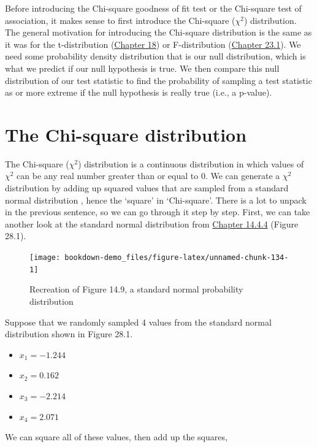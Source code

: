 \documentclass[
]{scrbook}
\providecommand{\tightlist}{%
  \setlength{\itemsep}{0pt}\setlength{\parskip}{0pt}}
\begin{document}
Before introducing the Chi-square goodness of fit test or the Chi-square test of association, it makes sense to first introduce the Chi-square (\(\chi^{2}\)) distribution.
The general motivation for introducing the Chi-square distribution is the same as it was for the t-distribution (\protect\hyperlink{Chapter_18}{Chapter 18}) or F-distribution (\protect\hyperlink{the-f-distribution}{Chapter 23.1}).
We need some probability density distribution that is our null distribution, which is what we predict if our null hypothesis is true.
We then compare this null distribution of our test statistic to find the probability of sampling a test statistic as or more extreme if the null hypothesis is really true (i.e., a p-value).

\hypertarget{the-chi-square-distribution}{%
\section{The Chi-square distribution}\label{the-chi-square-distribution}}

The Chi-square (\(\chi^{2}\)) distribution is a continuous distribution in which values of \(\chi^{2}\) can be any real number greater than or equal to 0. We can generate a \(\chi^{2}\) distribution by adding up squared values that are sampled from a standard normal distribution \citep{Sokal1995}, hence the `square' in `Chi-square'.
There is a lot to unpack in the previous sentence, so we can go through it step by step.
First, we can take another look at the standard normal distribution from \protect\hyperlink{normal-distribution}{Chapter 14.4.4} (Figure 28.1).

\begin{figure}
\texttt{[image: bookdown-demo\_files/figure-latex/unnamed-chunk-134-1]} \caption{Recreation of Figure 14.9, a standard normal probability distribution}\label{fig:unnamed-chunk-134}
\end{figure}

Suppose that we randomly sampled 4 values from the standard normal distribution shown in Figure 28.1.

\begin{itemize}
\tightlist
\item
  \(x_{1} = -1.244\)
\item
  \(x_{2} = 0.162\)
\item
  \(x_{3} = -2.214\)
\item
  \(x_{4} = 2.071\)
\end{itemize}

We can square all of these values, then add up the squares,
\end{document}
